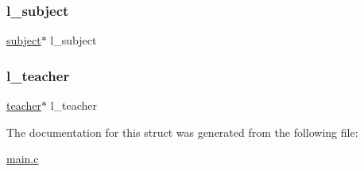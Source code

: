 \subsubsection{\texorpdfstring{l\+\_\+subject}{l\_subject}}
{\footnotesize\ttfamily \hyperlink{structsubject}{subject}$\ast$ l\+\_\+subject}

\hypertarget{structlecture_a4299a0a67212d8dd0ed38c7fc5a9d3eb}{}\label{structlecture_a4299a0a67212d8dd0ed38c7fc5a9d3eb} 
\subsubsection{\texorpdfstring{l\+\_\+teacher}{l\_teacher}}
{\footnotesize\ttfamily \hyperlink{structteacher}{teacher}$\ast$ l\+\_\+teacher}



The documentation for this struct was generated from the following file\+:\begin{DoxyCompactItemize}
\item 
\hyperlink{main_8c}{main.\+c}\end{DoxyCompactItemize}
